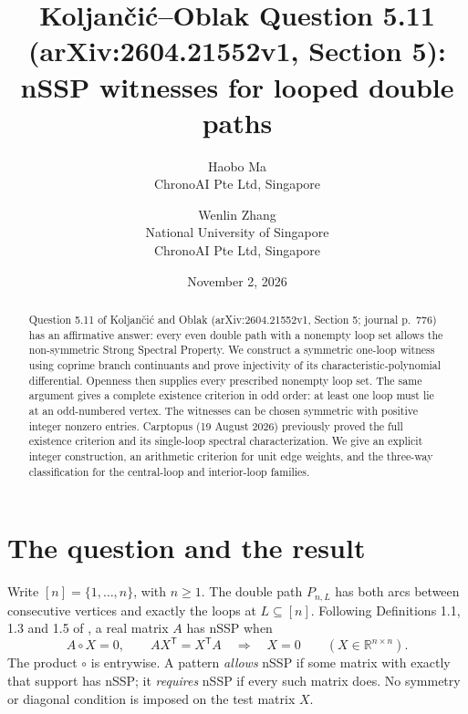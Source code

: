 \documentclass[11pt]{article}
\title{Koljan\v{c}i\'c--Oblak Question 5.11\\
(arXiv:2604.21552v1, Section 5):\\
nSSP witnesses for looped double paths}
\author{Haobo Ma\\\small ChronoAI Pte Ltd, Singapore
\and Wenlin Zhang\\\small National University of Singapore\\
\small ChronoAI Pte Ltd, Singapore}
\date{November 2, 2026}
\newcommand{\R}{\mathbb R}
\begin{document}
\maketitle
\begin{abstract}
Question 5.11 of Koljan\v{c}i\'c and Oblak
(arXiv:2604.21552v1, Section 5; journal p.~776) has an affirmative answer:
every even double path
with a nonempty loop set allows the non-symmetric Strong Spectral
Property. We construct a symmetric one-loop witness using coprime
branch continuants and prove injectivity of its characteristic-polynomial
differential. Openness then supplies every prescribed nonempty loop set.
The same argument gives a complete existence criterion in odd order:
at least one loop must lie at an odd-numbered vertex. The witnesses can
be chosen symmetric with positive integer nonzero entries. Carptopus
(19 August 2026) previously proved the full existence criterion and its
single-loop spectral characterization. We give an explicit integer
construction, an arithmetic criterion for unit edge weights, and the
three-way classification for the central-loop and interior-loop families.
\end{abstract}

\section{The question and the result}
Write $[n]=\{1,\ldots,n\}$, with $n\geq1$. The double path
$P_{n,L}$ has both arcs between consecutive vertices and exactly the
loops at $L\subseteq[n]$. Following Definitions 1.1, 1.3 and 1.5 of
\cite{KO}, a real matrix $A$ has nSSP when
\begin{equation}\label{eq:test}
 A\circ X=0,\qquad AX^{\mathsf T}=X^{\mathsf T}A
 \quad\Longrightarrow\quad X=0\qquad(X\in\R^{n\times n}).
\end{equation}
The product $\circ$ is entrywise. A pattern \emph{allows} nSSP if some
matrix with exactly that support has nSSP; it \emph{requires} nSSP if
every such matrix does. No symmetry or diagonal condition is imposed on
the test matrix $X$.
\end{document}
